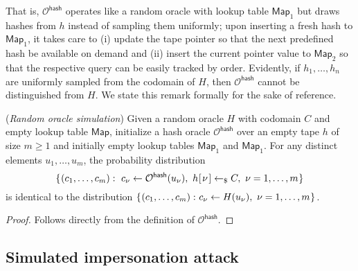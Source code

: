 \documentclass{iacrtrans}
\begin{document}
\noindent
That is, $\mathcal{O}^{\mathsf{hash}}$
operates like a random oracle with lookup table $\mathsf{Map}_1$
but draws hashes
from $h$ instead of sampling them uniformly;
upon inserting a fresh hash to $\mathsf{Map}_1$,
it takes care to
(i) update the tape pointer so that
the next predefined hash be available on demand and
(ii) insert the current pointer value to $\mathsf{Map}_2$
so that the respective query can be easily tracked by order.
Evidently, if $h_1, \dots, h_n$
are uniformly sampled from the codomain of $H$,
then $\mathcal{O}^{\mathsf{hash}}$
cannot be distinguished from $H$.
We state this remark formally for the sake of reference.

\begin{lem}\label{lemma_random_oracle_simulation}
\textup{(\textit{Random oracle simulation})}
Given a random oracle $H$ with codomain $C$
and empty lookup table $\mathsf{Map}$,
initialize a hash oracle $\mathcal{O}^{\mathsf{hash}}$
over an empty tape $h$ of size $m \ge 1$
and initially empty lookup tables $\mathsf{Map}_1$ and $\mathsf{Map}_1$.
For any distinct elements $u_1, \dots, u_m$,
the probability distribution
\vspace{5pt}
\begin{equation*}
\vspace{5pt}
\{\hspace{0.5pt}(c_1, \dots, c_m):
\ c_\nu \leftarrow \mathcal{O}^{\mathsf{hash}}(u_\nu),
\ h\hspace{0.5pt}
	[
		\hspace{1pt}
		\nu
		\hspace{1pt}
	]
	\leftarrow_\$
	C,
\ \nu = 1, \dots, m\hspace{0.5pt}\}
\end{equation*}
is identical to the distribution
$
\{\hspace{0.5pt}(c_1, \dots, c_m):\hspace{0.50pt}
c_\nu \leftarrow H(u_\nu),
\ \nu = 1, \dots, m\hspace{0.5pt}\}
$.
\end{lem}

\begin{proof}
Follows directly from the definition of $\mathcal{O}^{\mathsf{hash}}$.
\end{proof}

\subsection{Simulated impersonation attack}\label{section_simulated_impersonation_attack}
\end{document}
